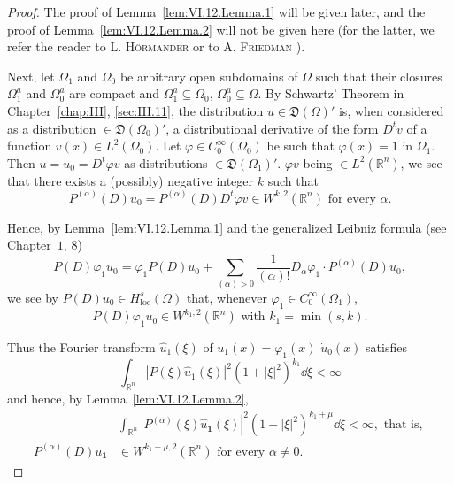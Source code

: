\begin{proof}
The proof of Lemma~\ref{lem:VI.12.Lemma.1} will be given later, and the proof of Lemma~\ref{lem:VI.12.Lemma.2} will not be given here (for the latter, we refer the reader to L. \textsc{Hörmander} \cite{hormander118} or to A. \textsc{Friedman} \cite{friedman68}). 

Next, let $\Omega_1$ and $\Omega_0$ be arbitrary open subdomains of $\Omega$ such that their closures $\Omega_1^a$ and $\Omega_0^a$ are compact and $\Omega_1^a \subseteq \Omega_0$, $\Omega_0^a \subseteq \Omega$. By Schwartz' Theorem in Chapter~\ref{chap:III}, \ref{sec:III.11}, the distribution $u \in \mathfrak{D}(\Omega)'$ is, when considered as a distribution $\in \mathfrak{D}(\Omega_0)'$, a distributional derivative of the form $D^t v$ of a function $v(x) \in L^2(\Omega_0)$. Let $\varphi \in C_0^\infty(\Omega_0)$ be such that $\varphi(x) = 1$ in $\Omega_1$. Then $u = u_0 = D^t \varphi v$ as distributions $\in \mathfrak{D}(\Omega_1)'$. $\varphi v$ being $\in L^2(\mathbb{R}^{n})$, we see that there exists a (possibly) negative integer $k$ such that 
\begin{equation}\label{eq:VI.12.7}
P ^{(\alpha)} (D) u _{0} = P ^{(\alpha)} (D) D ^{t} \varphi v \in W ^{k,2} \left(\mathbb{R}^{n}\right) \text{ for every } \alpha .
\end{equation}

Hence, by Lemma~\ref{lem:VI.12.Lemma.1} and the generalized Leibniz formula (see Chapter~\hyperref[chap:I]{$1$}, $8$) 
\begin{equation}\label{eq:VI.12.8}
P (D) \varphi_{1} u _{0} = \varphi_{1} P (D) u _{0} + \sum\limits_{(\alpha) > 0} \frac {1}{(\alpha) !} D _{\alpha} \varphi_{1} \cdot P ^{(\alpha)} (D) u _{0},
\end{equation}
we see by $P(D)u_0 \in H_{\mathrm{loc}}^s(\Omega)$ that, whenever $\varphi_1 \in C_0^\infty(\Omega_1)$, 
\begin{equation}\label{eq:VI.12.9}
P (D) \varphi_{1} u _{0} \in W ^ {k _{1}, 2} (\mathbb{R}^{n}) \text{ with } k _{1} = \min (s, k).
\end{equation}

Thus the Fourier transform $\hat{u}_1(\xi)$ of $u_1(x) = \varphi_1(x)$ $\dot{u}_0(x)$ satisfies 
\begin{equation}\label{eq:VI.12.10}
\int_ {\mathbb{R}^{n}} | P (\xi) \hat {u} _{1} (\xi) | ^{2} (1 + | \xi | ^{2}) ^ {k _{1}} \dd \xi < \infty
\end{equation}
and hence, by Lemma~\ref{lem:VI.12.Lemma.2}, 
\begin{equation}\label{eq:VI.12.11}
\begin{aligned}
&\int_ {\mathbb{R}^{n}} | P ^{(\alpha)} (\xi) \hat {u} _ {\mathbf {1}} (\xi) | ^{2} (1 + | \xi | ^{2}) ^ {k _{1} + \mu} \dd \xi < \infty , \text{ that is, }
\\
P ^{(\alpha)} (D) u _ {\mathbf {1}}& \in W ^ {k _{1} + \mu , 2} (\mathbb{R}^{n}) \text{ for every } \alpha \neq 0.
\end{aligned}
\end{equation}


\end{proof}
